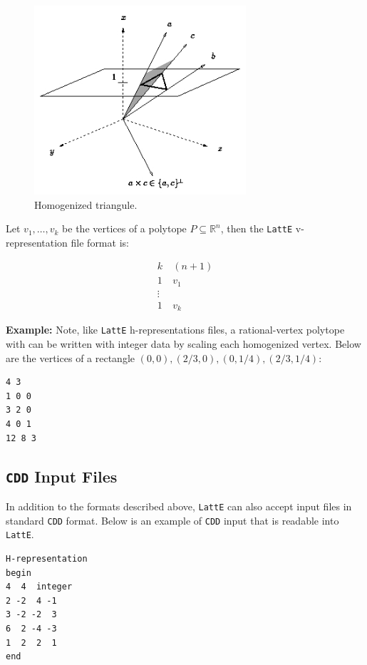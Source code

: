 \documentclass{article}
\newcommand{\R}{{\mathbb R}}
\newcommand{\latte}{{\tt LattE}\xspace}
\newcommand{\cdd}{{\tt CDD}\xspace}
\newcommand{\example}{{\bf Example:\space}}
\begin{document}
\begin{figure}
\centering
\includegraphics[width=0.7\textwidth]{homogenizedTriangle.jpg}
\caption{Homogenized triangule.}
\label{fig:homogenized-triangle}
\end{figure}


Let $v_1, \dots, v_k$ be the vertices of a polytope $P \subseteq \R^n$, then the \latte v-representation file format is:

\begin{align*}
        k &\: (n+1)\\
        1 &\: v_1\\
        \vdots & \\
        1 &\: v_k
\end{align*}


\example
Note, like \latte h-representations files, a rational-vertex polytope with can be written with integer data by scaling each homogenized vertex. Below are the vertices of a rectangle $(0,0), (2/3,0), (0,1/4), (2/3, 1/4)$:
\begin{verbatim}
4 3
1 0 0
3 2 0
4 0 1
12 8 3
\end{verbatim}

\subsection{\cdd Input Files}
In addition to the formats described above, {\tt LattE} can also
accept input files in standard \cdd format. Below is
an example of \cdd input that is readable into \latte.
\begin{verbatim}
H-representation
begin
4  4  integer
2 -2  4 -1
3 -2 -2  3
6  2 -4 -3
1  2  2  1
end
\end{verbatim}
\end{document}
